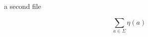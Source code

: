 \documentclass{article}
\begin{document}
a second file

\[
    \sum_{a\in\Sigma} \eta(a)
\]
\end{document}
